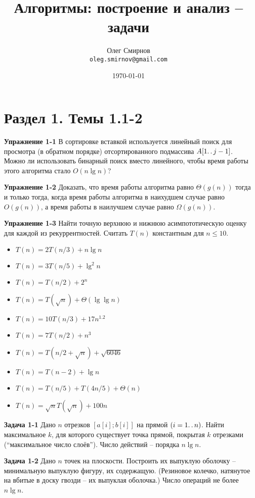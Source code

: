 \documentclass[a4paper,11pt]{article}
\author{Олег Смирнов\\
\texttt{oleg.smirnov@gmail.com}}
\date{\today}
\title{Алгоритмы: построение и анализ -- задачи}
\begin{document}
\section*{Раздел 1. Темы 1.1-2}
\textbf{Упражнение 1-1} В сортировке вставкой используется линейный поиск для просмотра (в обратном порядке) отсортированного подмассива $A[1 \ldotp\ldotp j-1]$. Можно ли использовать бинарный поиск вместо линейного, чтобы время работы этого алгоритма стало $O(n \lg n)$?

\textbf{Упражнение 1-2} Доказать, что время работы алгоритма равно $\Theta(g(n))$ тогда и только тогда, когда время работы алгоритма в наихудшем случае равно $O(g(n))$, а время работы в наилучшем случае равно $\Omega(g(n))$.

\textbf{Упражнение 1-3} Найти точную верхнюю и нижнюю асимпототическую оценку для каждой из рекуррентностей. Считать $T(n)$ константным для $n \leqslant 10$.
\begin{itemize}
\item $T(n) = 2 T(n/3) + n \lg{n}$
\item $T(n) = 3 T(n/5) + \lg^2 {n}$
\item $T(n) = T(n/2) + 2^n$
\item $T(n) = T(\sqrt{n}) + \Theta(\lg \lg n)$
\item $T(n) = 10 T(n/3) + 17 n^{1.2}$
\item $T(n) = 7 T(n/2) + n^3$
\item $T(n) = T(n/2 + \sqrt{n}) + \sqrt{6046}$
\item $T(n) = T(n-2) + \lg{n}$
\item $T(n) = T(n/5)+ T(4n/5) +\Theta(n)$
\item $T(n) = \sqrt{n} T(\sqrt{n}) + 100 n$
\end{itemize}

\textbf{Задача 1-1} Дано $n$ отрезков $[a[i]; b[i]]$ на прямой $(i = 1 \ldotp\ldotp n)$. Найти максимальное $k$, для которого существует точка прямой, покрытая $k$ отрезками (``максимальное число слоёв''). Число действий -- порядка $n \lg n$.

\textbf{Задача 1-2} Дано $n$ точек на плоскости. Построить их выпуклую оболочку -- минимальную выпуклую фигуру, их содержащую. (Резиновое колечко, натянутое на вбитые в доску гвозди -- их выпуклая оболочка.) Число операций не более $n \lg n$.
\end{document}
